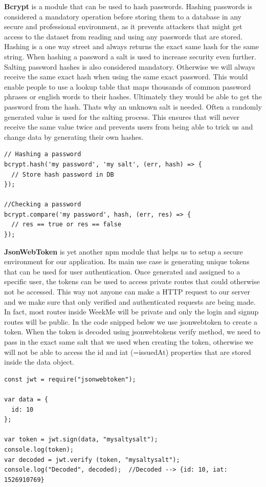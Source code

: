 \documentclass[11pt]{article}
\begin{document}
\textbf{Bcrypt} is a module that can be used to hash passwords. Hashing passwords is considered a mandatory operation before storing them to a database in any secure and professional environment, as it prevents attackers that might get access to the dataset from reading and using any passwords that are stored. Hashing is a one way street and always returns the exact same hash for the same string. When hashing a password a salt is used to increase security even further. Salting password hashes is also considered mandatory. Otherwise we will always receive the same exact hash when using the same exact password. This would enable people to use a lookup table that maps thousands of common password phrases or english words to their hashes. Ultimately they would be able to get the password from the hash. Thats why an unknown salt is needed. Often a randomly generated value is used for the salting process. This ensures that will never receive the same value twice and prevents users from being able to trick us and change data by generating their own hashes. 

\begin{lstlisting}
// Hashing a password
bcrypt.hash('my password', 'my salt', (err, hash) => {
  // Store hash password in DB
});

//Checking a password
bcrypt.compare('my password', hash, (err, res) => {
  // res == true or res == false
});
\end{lstlisting}


\textbf{JsonWebToken} is yet another npm module that helps us to setup a secure environment for our application. Its main use case is generating unique tokens that can be used for user authentication. Once generated and assigned to a specific user, the tokens can be used to access private routes that could otherwise not be accessed. This way not anyone can make a HTTP request to our server and we make sure that only verified and authenticated requests are being made. In fact, most routes inside WeekMe will be private and only the login and signup routes will be public. In the code snipped below we use jsonwebtoken to create a token. When the token is decoded using jsonwebtokens verify method, we need to pass in the exact same salt that we used when creating the token, otherwise we will not be able to access the id and iat (=issuedAt) properties that are stored inside the data object.  

\begin{lstlisting}
const jwt = require("jsonwebtoken");

var data = {
  id: 10
};

var token = jwt.sign(data, "mysaltysalt");
console.log(token);
var decoded = jwt.verify (token, "mysaltysalt");
console.log("Decoded", decoded);  //Decoded --> {id: 10, iat: 1526910769}
\end{lstlisting}
\end{document}
